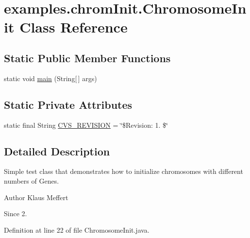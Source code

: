 \hypertarget{classexamples_1_1chrom_init_1_1_chromosome_init}{\section{examples.\-chrom\-Init.\-Chromosome\-Init Class Reference}
\label{classexamples_1_1chrom_init_1_1_chromosome_init}
}
\subsection*{Static Public Member Functions}
\begin{DoxyCompactItemize}
\item 
static void \hyperlink{classexamples_1_1chrom_init_1_1_chromosome_init_a19913b822b6e365456d5bd2ab47d7637}{main} (String\mbox{[}$\,$\mbox{]} args)
\end{DoxyCompactItemize}
\subsection*{Static Private Attributes}
\begin{DoxyCompactItemize}
\item 
static final String \hyperlink{classexamples_1_1chrom_init_1_1_chromosome_init_a3383b876a809eaaa31d3c6747a2862fd}{C\-V\-S\-\_\-\-R\-E\-V\-I\-S\-I\-O\-N} = \char`\"{}\$Revision\-: 1. \$\char`\"{}
\end{DoxyCompactItemize}


\subsection{Detailed Description}
Simple test class that demonstrates how to initialize chromosomes with different numbers of Genes.

\begin{DoxyAuthor}{Author}
Klaus Meffert 
\end{DoxyAuthor}
\begin{DoxySince}{Since}
2. 
\end{DoxySince}


Definition at line 22 of file Chromosome\-Init.\-java.



